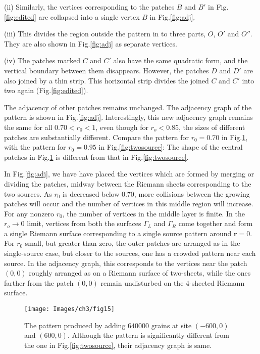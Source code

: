 \documentclass[11pt,a4paper]{book}
\begin{document}
(ii) Similarly, the vertices corresponding to the patches $B$ and $B'$ in 
Fig.\ref{fig:edited} are collapsed into a single vertex $B$ in Fig.\ref{fig:adj}.

(iii) This divides the region outside the pattern in to three parts, $O$, $O'$ and $O''$.
They are also shown in Fig.\ref{fig:adj} as separate vertices.

(iv) The patches marked $C$ and $C'$ also have the same quadratic form, and the
vertical boundary between them disappears. However, the patches $D$ and $D'$ are
also joined by a thin strip. This horizontal strip divides the joined $C$ and $C'$
into two again (Fig.\ref{fig:edited}). 

The adjacency of other patches remains unchanged. The adjacency graph of the
pattern is shown in Fig.\ref{fig:adj}. Interestingly, this new adjacency graph
remains the same for all $0.70 < r_0 < 1$, even though  for $r_{o} < 0.85$,
the sizes of different patches are substantially different. Compare the pattern
for $r_0 =0.70$ in Fig.\ref{fig:bellow}, with the pattern for $r_0=0.95$ in Fig.\ref{fig:twosource}:
The shape of the central patches in Fig.\ref{fig:bellow} is different
from that in Fig.\ref{fig:twosource}.

In Fig.\ref{fig:adj}, we have have placed  the vertices which are formed by merging
or dividing the patches, midway between the Riemann sheets corresponding
to the two sources. As $r_0$ is  decreased  below $0.70$, more collisions between the
growing patches will occur and the number of vertices in this middle region will increase.
For any nonzero $r_0$, the number of vertices in the middle layer is finite. In the
$r_{o}\rightarrow 0$ limit, vertices from both the surfaces $\Gamma_{L}$ and $\Gamma_{R}$
come together and form a single Riemann surface corresponding to a single source pattern
around $\mathbf{r}=0$. For $r_0$ small, but greater than zero, the outer patches are arranged
as in the single-source case, but closer to the sources, one has a crowded pattern near each
source. In the adjacency graph, this corresponds to the vertices near the patch $(0,0)$ roughly
arranged as on a Riemann surface of two-sheets, while the ones farther from the patch $(0,0)$
remain undisturbed on the 4-sheeted Riemann surface.
\begin{figure}
\begin{center}
\texttt{[image: Images/ch3/fig15]}
\end{center}
\caption{ The pattern produced by adding $640000$ grains at site $\left( -600,0 \right)$
and $\left( 600,0 \right)$. Although the pattern is significantly different from
the one in Fig.\ref{fig:twosource}, their adjacency graph is same.}
\label{fig:bellow}
\end{figure}
\end{document}
